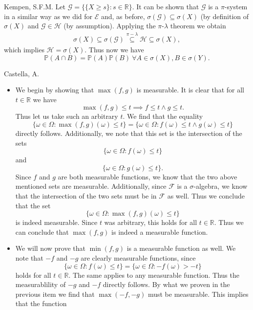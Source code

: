 \begin{solution}[5.3]{Kempen, S.F.M.}
    \noindent Let $\mathcal{G} = \{\{X\geq s\}: s\in \mathbb{R}\}$. It can be shown that $\mathcal{G}$ is a $\pi$-system in a similar way as we did for $\mathcal{E}$ and, as before, $\sigma(\mathcal{G}) \subseteq \sigma(X)$ (by definition of $\sigma(X)$ and $\mathcal{G} \in \mathcal{H}$ (by assumption). Applying the $\pi$-$\lambda$ theorem we obtain
    \begin{align*}
        \sigma(X) \subseteq \sigma(\mathcal{G}) \stackrel{\pi-\lambda}{\subseteq} \mathcal{H} \subseteq \sigma(X),
    \end{align*}
    which implies $\mathcal{H} = \sigma(X)$. Thus now we have
    $$ \mathbb{P}(A\cap B) = \mathbb{P}(A)\mathbb{P}(B) \ \forall A\in \sigma(X), B\in \sigma(Y).  $$
\end{solution}

\begin{solution}[5.4]{Castella, A.}
    \begin{itemize}
        \item We begin by showing that $\max(f,g)$ is measurable. It is clear that for all $t \in \mathbb{R}$ we have
        $$
            \max(f,g) \leq t \implies f \leq t \land g \leq t.
        $$
        Thus let us take such an arbitrary $t$. We find that the equality
        $$
            \{\omega \in \Omega : \max(f,g)(\omega) \leq t\} = \{\omega \in \Omega : f(\omega) \leq t \land g(\omega) \leq t\}
        $$
        directly follows. Additionally, we note that this set is the intersection of the sets
        $$
            \{\omega \in \Omega : f(\omega) \leq t\}
        $$
        and
        $$
            \{\omega \in \Omega : g(\omega) \leq t\}.
        $$
        Since $f$ and $g$ are both measurable functions, we know that the two above mentioned sets are measurable. Additionally, since $\mathcal{F}$ is a $\sigma$-algebra, we know that the intersection of the two sets must be in $\mathcal{F}$ as well. Thus we conclude that the set
        $$
            \{\omega \in \Omega : \max(f, g)(\omega) \leq t\}
        $$
        is indeed measurable. Since $t$ was arbitrary, this holds for all $t \in \mathbb{R}$. Thus we can conclude that $\max(f,g)$ is indeed a measurable function.
        \item We will now prove that $\min(f,g)$ is a measurable function as well. We note that $-f$ and $-g$ are clearly measurable functions, since
        $$
            \{\omega \in \Omega : f(\omega) \leq t\} = \{\omega \in \Omega : -f(\omega) > -t\}
        $$
        holds for all $t \in \mathbb{R}$. The same applies to any measurable function. Thus the measurablility of $-g$ and $-f$ directly follows. By what we proven in the previous item we find that $\max(-f, -g)$ must be measurable. This implies that the function

\end{itemize}
\end{solution}
